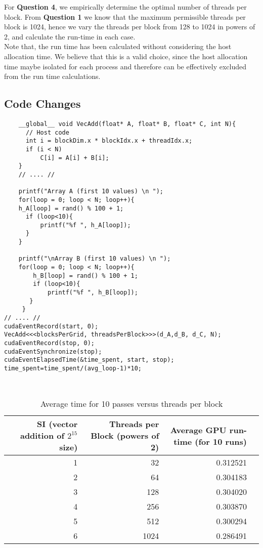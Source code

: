 For \textbf{Question 4}, we empirically determine the optimal number of threads per block. From \textbf{Question 1} we know that the maximum permissible threads per block is 1024, hence we vary the threads per block from 128 to 1024 in powers of 2, and calculate the run-time in each case. \\

Note that, the run time has been calculated without considering the host allocation time. We believe that this is a valid choice, since the host allocation time maybe isolated for each process and therefore can be effectively excluded from the run time calculations.\\

\subsection{Code Changes}
\begin{lstlisting}
	__global__ void VecAdd(float* A, float* B, float* C, int N){
      // Host code
      int i = blockDim.x * blockIdx.x + threadIdx.x;
      if (i < N)
          C[i] = A[i] + B[i];
    }
    // .... //
    
    printf("Array A (first 10 values) \n ");
    for(loop = 0; loop < N; loop++){
    h_A[loop] = rand() % 100 + 1;
      if (loop<10){
          printf("%f ", h_A[loop]);
      }
    }

    printf("\nArray B (first 10 values) \n ");
    for(loop = 0; loop < N; loop++){
        h_B[loop] = rand() % 100 + 1;
        if (loop<10){
            printf("%f ", h_B[loop]);
       }
     }
// .... //
cudaEventRecord(start, 0);
VecAdd<<<blocksPerGrid, threadsPerBlock>>>(d_A,d_B, d_C, N);
cudaEventRecord(stop, 0);
cudaEventSynchronize(stop);
cudaEventElapsedTime(&time_spent, start, stop);
time_spent=time_spent/(avg_loop-1)*10;
\end{lstlisting} \\

\begin{table}[ht]
\footnotesize
\centering
\begin{tabular}{r||rrr}
 SI (vector addition of $2^{15}$ size) & Threads per Block (powers of 2) & Average GPU run-time (for 10 runs)  \\ 
 \hline \hline
1 & 32 &  0.312521 \\ 
2& 64  & 0.304183 \\
3& 128 & 0.304020 \\
4& 256 & 0.303870 \\
5& 512 & 0.300294 \\
6 & 1024 &0.286491 \\
\end{tabular}
\caption{Average time for 10 passes versus threads per block}
\end{table}

